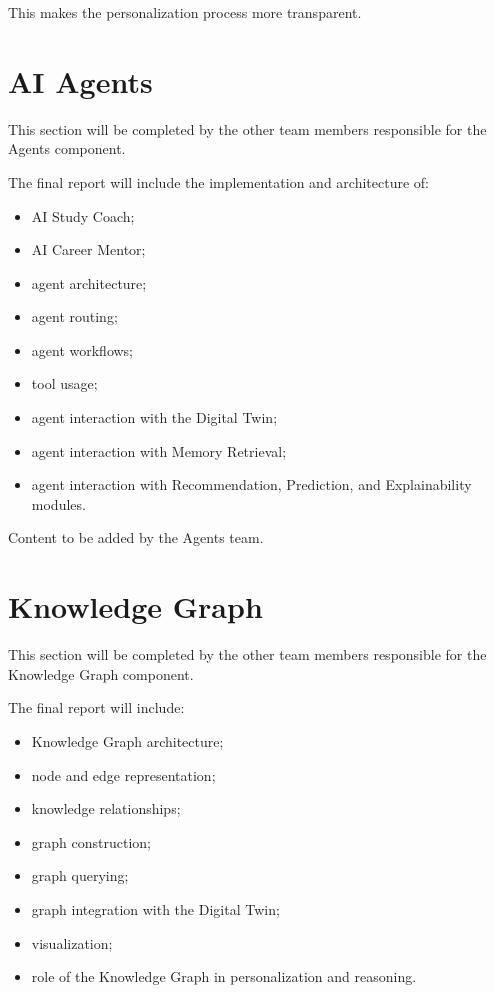 \documentclass[12pt,a4paper]{article}
\begin{document}
This makes the personalization process more transparent.

\section{AI Agents}
This section will be completed by the other team members responsible for the Agents component.

The final report will include the implementation and architecture of:
\begin{itemize}[noitemsep,topsep=2pt]
    \item AI Study Coach;
    \item AI Career Mentor;
    \item agent architecture;
    \item agent routing;
    \item agent workflows;
    \item tool usage;
    \item agent interaction with the Digital Twin;
    \item agent interaction with Memory Retrieval;
    \item agent interaction with Recommendation, Prediction, and Explainability modules.
\end{itemize}

Content to be added by the Agents team.

\section{Knowledge Graph}
This section will be completed by the other team members responsible for the Knowledge Graph component.

The final report will include:
\begin{itemize}[noitemsep,topsep=2pt]
    \item Knowledge Graph architecture;
    \item node and edge representation;
    \item knowledge relationships;
    \item graph construction;
    \item graph querying;
    \item graph integration with the Digital Twin;
    \item visualization;
    \item role of the Knowledge Graph in personalization and reasoning.
\end{itemize}
\end{document}
